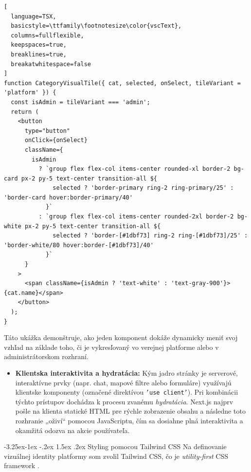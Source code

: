 \documentclass[12pt]{article}
\makeatletter
\renewcommand{\subsubsection}{\@startsection{subsubsection}{3}{\z@}%
  {-3.25ex\@plus -1ex \@minus -.2ex}%
  {1.5ex \@plus .2ex}%
  {\normalfont\large\bfseries}}
\makeatother
\begin{document}
\noindent\begin{minipage}{\linewidth}
\begin{lstlisting}[
  language=TSX,
  basicstyle=\ttfamily\footnotesize\color{vscText},
  columns=fullflexible,
  keepspaces=true,
  breaklines=true,
  breakatwhitespace=false
]
function CategoryVisualTile({ cat, selected, onSelect, tileVariant = 'platform' }) {
  const isAdmin = tileVariant === 'admin';
  return (
    <button
      type="button"
      onClick={onSelect}
      className={
        isAdmin
          ? `group flex flex-col items-center rounded-xl border-2 bg-card px-2 py-5 text-center transition-all ${
              selected ? 'border-primary ring-2 ring-primary/25' : 'border-card hover:border-primary/40'
            }`
          : `group flex flex-col items-center rounded-2xl border-2 bg-white px-2 py-5 text-center transition-all ${
              selected ? 'border-[#1dbf73] ring-2 ring-[#1dbf73]/25' : 'border-white/80 hover:border-[#1dbf73]/40'
            }`
      }
    >
      <span className={isAdmin ? 'text-white' : 'text-gray-900'}>{cat.name}</span>
    </button>
  );
}
\end{lstlisting}
\end{minipage}
\vspace{0.4\baselineskip}
\noindent
Táto ukážka demonštruje, ako jeden komponent dokáže dynamicky meniť svoj vzhľad na základe toho, či je vykresľovaný vo verejnej platforme alebo v administrátorskom rozhraní.

\begin{itemize}
  \item \textbf{Klientska interaktivita a hydratácia:} Kým jadro stránky je serverové, interaktívne prvky (napr. chat, mapové filtre alebo formuláre) využívajú klientske komponenty (označené direktívou \texttt{'use client'}). Pri kombinácii týchto prístupov dochádza k procesu zvanému \emph{hydratácia}. Next.js najprv pošle na klienta statické HTML pre rýchle zobrazenie obsahu a následne toto rozhranie „oživí“ pomocou JavaScriptu, čím sa dosiahne plná interaktivita a okamžitá odozva na akcie používateľa.
\end{itemize}

\subsubsection{Styling pomocou Tailwind CSS}
\noindent
Na definovanie vizuálnej identity platformy som zvolil Tailwind CSS, čo je \emph{utility-first} CSS framework \parencite{riva2022nextjs}.
\end{document}

